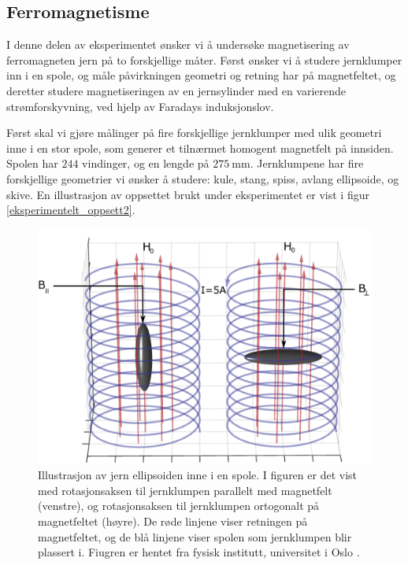 \documentclass[%
 reprint,
 amsmath,amssymb,
 aps,
 norsk,
]{revtex4-1}
\begin{document}
\subsection{Ferromagnetisme}
I denne delen av eksperimentet ønsker vi å undersøke magnetisering av ferromagneten jern på to forskjellige måter. Først ønsker vi å studere jernklumper inn i en spole, og måle påvirkningen geometri og retning har på magnetfeltet, og deretter studere magnetiseringen av en jernsylinder med en varierende strømforskyvning, ved hjelp av Faradays induksjonslov. \par
Først skal vi gjøre målinger på fire forskjellige jernklumper med ulik geometri inne i en stor spole, som generer et tilnærmet homogent magnetfelt på innsiden. Spolen har $244$ vindinger, og en lengde på $\SI{275}{\milli\meter}$. Jernklumpene har fire forskjellige geometrier vi ønsker å studere: kule, stang, spiss, avlang ellipsoide, og skive. En illustrasjon av oppsettet brukt under eksperimentet er vist i figur \vref{eksperimentelt_oppsett2}.
\begin{figure}[h!]
  \centering
  \includegraphics[scale=0.24]{oppsett2.png}
  \caption{Illustrasjon av jern ellipsoiden inne i en spole. I figuren er det vist med rotasjonsaksen til jernklumpen parallelt med magnetfelt (venstre), og rotasjonsaksen til jernklumpen ortogonalt på magnetfeltet (høyre). De røde linjene viser retningen på magnetfeltet, og de blå linjene viser spolen som jernklumpen blir plassert i. Fiugren er hentet fra fysisk institutt, universitet i Oslo \cite{oppgave}.}
  \label{eksperimentelt_oppsett2}
\end{figure}
\end{document}
